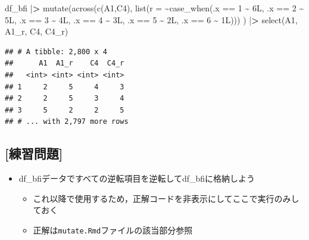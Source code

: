\documentclass[
  xelatex,ja=standard, b5paper]{bxjsbook}
\newenvironment{Shaded}{\begin{snugshade}}{\end{snugshade}}
\newcommand{\AttributeTok}[1]{\textcolor[rgb]{0.77,0.63,0.00}{#1}}
\newcommand{\DecValTok}[1]{\textcolor[rgb]{0.00,0.00,0.81}{#1}}
\newcommand{\ErrorTok}[1]{\textcolor[rgb]{0.64,0.00,0.00}{\textbf{#1}}}
\newcommand{\FunctionTok}[1]{\textcolor[rgb]{0.00,0.00,0.00}{#1}}
\newcommand{\NormalTok}[1]{#1}
\newcommand{\SpecialCharTok}[1]{\textcolor[rgb]{0.00,0.00,0.00}{#1}}
\providecommand{\tightlist}{%
  \setlength{\itemsep}{0pt}\setlength{\parskip}{0pt}}
\begin{document}
\begin{Shaded}
\begin{Highlighting}[]
\NormalTok{df\_bfi }\SpecialCharTok{|}\ErrorTok{\textgreater{}} 
  \FunctionTok{mutate}\NormalTok{(}\FunctionTok{across}\NormalTok{(}\FunctionTok{c}\NormalTok{(A1,C4),}
                \FunctionTok{list}\NormalTok{(}\AttributeTok{r =} \SpecialCharTok{\textasciitilde{}}\FunctionTok{case\_when}\NormalTok{(.x }\SpecialCharTok{==} \DecValTok{1} \SpecialCharTok{\textasciitilde{}}\NormalTok{ 6L,}
\NormalTok{                                    .x }\SpecialCharTok{==} \DecValTok{2} \SpecialCharTok{\textasciitilde{}}\NormalTok{ 5L,}
\NormalTok{                                    .x }\SpecialCharTok{==} \DecValTok{3} \SpecialCharTok{\textasciitilde{}}\NormalTok{ 4L,}
\NormalTok{                                    .x }\SpecialCharTok{==} \DecValTok{4} \SpecialCharTok{\textasciitilde{}}\NormalTok{ 3L,}
\NormalTok{                                    .x }\SpecialCharTok{==} \DecValTok{5} \SpecialCharTok{\textasciitilde{}}\NormalTok{ 2L,}
\NormalTok{                                    .x }\SpecialCharTok{==} \DecValTok{6} \SpecialCharTok{\textasciitilde{}}\NormalTok{ 1L)))}
\NormalTok{         ) }\SpecialCharTok{|}\ErrorTok{\textgreater{}} 
  \FunctionTok{select}\NormalTok{(A1, A1\_r, C4, C4\_r)}
\end{Highlighting}
\end{Shaded}

\begin{verbatim}
## # A tibble: 2,800 x 4
##      A1  A1_r    C4  C4_r
##   <int> <int> <int> <int>
## 1     2     5     4     3
## 2     2     5     3     4
## 3     5     2     2     5
## # ... with 2,797 more rows
\end{verbatim}

\hypertarget{ux7df4ux7fd2ux554fux984c-13}{%
\subsection{{[}練習問題{]}}\label{ux7df4ux7fd2ux554fux984c-13}}

\begin{itemize}
\tightlist
\item
  df\_bfiデータですべての逆転項目を逆転してdf\_bfiに格納しよう

  \begin{itemize}
  \tightlist
  \item
    これ以降で使用するため，正解コードを非表示にしてここで実行のみしておく
  \item
    正解は\texttt{mutate.Rmd}ファイルの該当部分参照
  \end{itemize}
\end{itemize}
\end{document}

